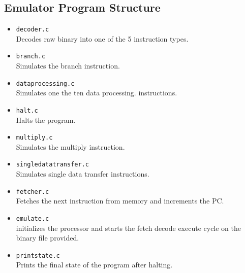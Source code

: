 \documentclass[8pt]{article}
\begin{document}
\begin{minipage}{0.45\textwidth}
\subsection{Emulator Program Structure}

\begin{itemize}
    \item \texttt{decoder.c} \\ Decodes raw binary into one of the 5 instruction 
    types.
    \item \texttt{branch.c} \\ Simulates the branch instruction.
    \item \texttt{dataprocessing.c} \\ Simulates one the ten data processing. 
    instructions.
    \item \texttt{halt.c} \\  Halts the program.
    \item \texttt{multiply.c} \\ Simulates the multiply instruction.
    \item \texttt{singledatatransfer.c} \\ Simulates single data transfer instructions.
    \item \texttt{fetcher.c} \\ Fetches the next instruction from memory and
    increments the PC.
    \item \texttt{emulate.c} \\ initializes the processor and starts the fetch decode
    execute cycle on the binary file provided. 
    \item \texttt{printstate.c} \\ Prints the final state of the program after 
    halting.
\end{itemize}
\end{minipage}%
\hfill
\end{document}
